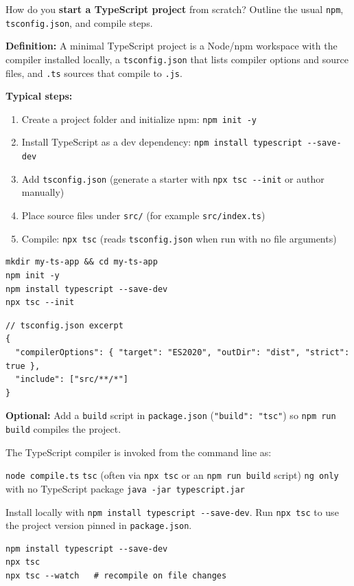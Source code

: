 \question[6]
How do you \textbf{start a TypeScript project} from scratch? Outline the usual \texttt{npm}, \texttt{tsconfig.json}, and compile steps.
\begin{solutionorbox}[5in]
\textbf{Definition:} A minimal TypeScript project is a Node/npm workspace with the compiler installed locally, a \texttt{tsconfig.json} that lists compiler options and source files, and \texttt{.ts} sources that compile to \texttt{.js}.

\textbf{Typical steps:}
\begin{enumerate}
  \item Create a project folder and initialize npm: \lstinline[style=bashinline]|npm init -y|
  \item Install TypeScript as a dev dependency: \lstinline[style=bashinline]|npm install typescript --save-dev|
  \item Add \texttt{tsconfig.json} (generate a starter with \lstinline[style=bashinline]|npx tsc --init| or author manually)
  \item Place source files under \texttt{src/} (for example \texttt{src/index.ts})
  \item Compile: \lstinline[style=bashinline]|npx tsc| (reads \texttt{tsconfig.json} when run with no file arguments)
\end{enumerate}

\begin{lstlisting}[style=bash]
mkdir my-ts-app && cd my-ts-app
npm init -y
npm install typescript --save-dev
npx tsc --init
\end{lstlisting}

\begin{lstlisting}[style=ts]
// tsconfig.json excerpt
{
  "compilerOptions": { "target": "ES2020", "outDir": "dist", "strict": true },
  "include": ["src/**/*"]
}
\end{lstlisting}

\textbf{Optional:} Add a \texttt{build} script in \texttt{package.json} (\lstinline[style=bashinline]|"build": "tsc"|) so \lstinline[style=bashinline]|npm run build| compiles the project.
\end{solutionorbox}

\question[4]
The TypeScript compiler is invoked from the command line as:
\begin{choices}
  \choice \lstinline[style=bashinline]|node compile.ts|
  \CorrectChoice \lstinline[style=bashinline]|tsc| (often via \lstinline[style=bashinline]|npx tsc| or an \lstinline[style=bashinline]|npm run build| script)
  \choice \lstinline[style=bashinline]|ng only| with no TypeScript package
  \choice \lstinline[style=bashinline]|java -jar typescript.jar|
\end{choices}
\begin{solution}
  Install locally with \lstinline[style=bashinline]|npm install typescript --save-dev|. Run \lstinline[style=bashinline]|npx tsc| to use the project version pinned in \texttt{package.json}.
\begin{lstlisting}[style=bash]
npm install typescript --save-dev
npx tsc
npx tsc --watch   # recompile on file changes
\end{lstlisting}
\end{solution}



